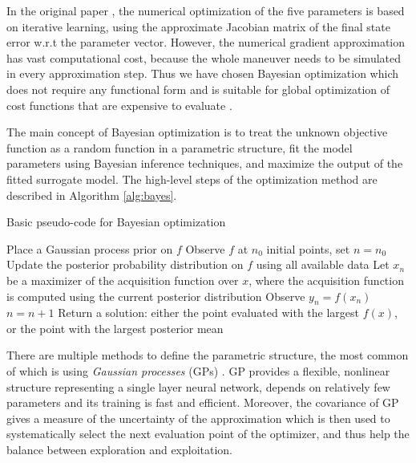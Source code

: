 In the original paper \cite{LSICRA2010}, the numerical optimization of the five parameters is based on iterative learning, using the approximate Jacobian matrix of the final state error w.r.t the parameter vector. However, the numerical gradient approximation has vast computational cost, because the whole maneuver needs to be simulated in every approximation step. Thus we have chosen Bayesian optimization which does not require any functional form and is suitable for global optimization of cost functions that are expensive to evaluate \cite{frazier2018tutorial, bayesopt2, brochu2010tutorial}.

The main concept of Bayesian optimization is to treat the unknown objective function as a random function in a parametric structure, fit the model parameters using Bayesian inference techniques, and maximize the output of the fitted surrogate model. The high-level steps of the optimization method are described in Algorithm \ref{alg:bayes}.
\begin{algorithm}
\caption{Basic pseudo-code for Bayesian optimization \cite{frazier2018tutorial}}
\label{alg:bayes}
\begin{algorithmic}[1]
	\State Place a Gaussian process prior on $f$
    \State Observe $f$ at $n_0$ initial points, set $n=n_0$
    \State Update the posterior probability distribution on $f$ using all available data
    \State Let $x_n$ be a maximizer of the acquisition function over $x$, where the acquisition function is computed using the current posterior distribution
    \State Observe $y_n = f(x_n)$
    \State $n=n+1$
	\EndWhile
	\State Return a solution: either the point evaluated with the largest $f(x)$, or the point with the largest posterior mean
\end{algorithmic}
\end{algorithm}
There are multiple methods to define the parametric structure, the most common of which is using \textit{Gaussian processes} (GPs) \cite{GPMPC2019}. GP provides a flexible, nonlinear structure representing a single layer neural network, depends on relatively few parameters and its training is fast and efficient. Moreover, the covariance of GP gives a measure of the uncertainty of the approximation which is then used to systematically select the next evaluation point of the optimizer, and thus help the balance between exploration and exploitation.

